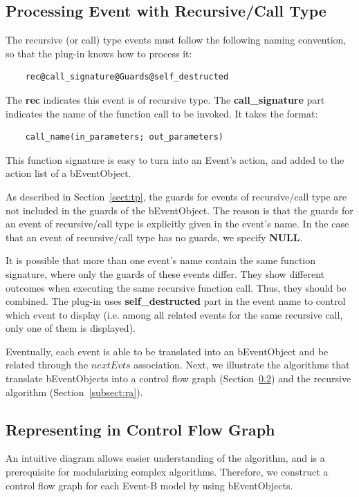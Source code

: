 \documentclass{easychair}
\begin{document}
\subsection{Processing Event with Recursive/Call Type}\label{subsec:issue}
The recursive (or call) type events must follow the following naming convention, so that the plug-in knows how to process it:

\lstset{language=[68]Algol}
\begin{lstlisting}
	rec@call_signature@Guards@self_destructed
\end{lstlisting}

The \textbf{rec} indicates this event is of recursive type. The \textbf{call\_signature} part indicates the name of the function call to be invoked. It takes the format:
\lstset{language=[68]Algol}
\begin{lstlisting}
	call_name(in_parameters; out_parameters)
\end{lstlisting} 
This function signature is easy to turn into an Event's action, and added to the action list of a bEventObject. 

As described in Section~\ref{sect:tp}, the guards for events of recursive/call type are not included in the guards of the bEventObject. The reason is that the guards for an event of recursive/call type is explicitly given in the event's name. In the case that an event of recursive/call type has no guards, we specify \textbf{NULL}. 

It is possible that more than one event's name contain the same function signature, where only the guards of these events differ. They show different outcomes when executing the same recursive function call. Thus, they should be combined. The plug-in uses \textbf{self\_destructed} part in the event name to control which event to display (i.e. among all related events for the same recursive call, only one of them is displayed). 

Eventually, each event is able to be translated into an bEventObject and be related through the $nextEvts$ association. Next, we illustrate the algorithms that translate bEventObjects into a control flow graph (Section~\ref{subsect:vis}) and the recursive algorithm (Section~\ref{subsect:ra}).


\subsection{Representing in Control Flow Graph} \label{subsect:vis}
An intuitive diagram allows easier understanding of the algorithm, and is a prerequisite for modularizing complex algorithms. Therefore, we construct a control flow graph for each Event-B model by using bEventObjects.
\end{document}
